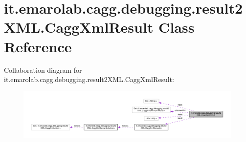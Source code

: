 \hypertarget{classit_1_1emarolab_1_1cagg_1_1debugging_1_1result2XML_1_1CaggXmlResult}{\section{it.\-emarolab.\-cagg.\-debugging.\-result2\-X\-M\-L.\-Cagg\-Xml\-Result Class Reference}
\label{classit_1_1emarolab_1_1cagg_1_1debugging_1_1result2XML_1_1CaggXmlResult}
}


Collaboration diagram for it.\-emarolab.\-cagg.\-debugging.\-result2\-X\-M\-L.\-Cagg\-Xml\-Result\-:\nopagebreak
\begin{figure}[H]
\begin{center}
\leavevmode
\includegraphics[width=350pt]{classit_1_1emarolab_1_1cagg_1_1debugging_1_1result2XML_1_1CaggXmlResult__coll__graph}
\end{center}
\end{figure}
